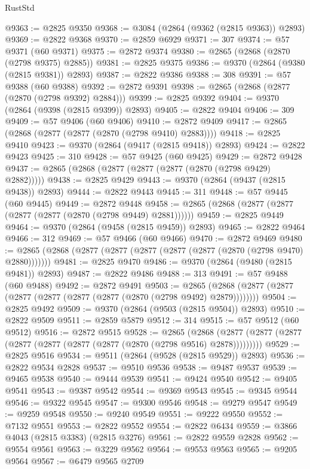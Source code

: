 \begin{lexlean}{RustStd}
\begin{coremodule}
@9363 := @2825 @9350
@9368 := @3084 (@2864 (@9362 (@2815 @9363)) @2893)
@9369 := @2822 @9368
@9370 := @2859 @6929
@9371 := 307
@9374 := @57 @9371 (@60 @9371)
@9375 := @2872 @9374
@9380 := @2865 (@2868 (@2870 (@2798 @9375) @2885))
@9381 := @2825 @9375
@9386 := @9370 (@2864 (@9380 (@2815 @9381)) @2893)
@9387 := @2822 @9386
@9388 := 308
@9391 := @57 @9388 (@60 @9388)
@9392 := @2872 @9391
@9398 := @2865 (@2868 (@2877 (@2870 (@2798 @9392) @2884)))
@9399 := @2825 @9392
@9404 := @9370 (@2864 (@9398 (@2815 @9399)) @2893)
@9405 := @2822 @9404
@9406 := 309
@9409 := @57 @9406 (@60 @9406)
@9410 := @2872 @9409
@9417 := @2865 (@2868 (@2877 (@2877 (@2870 (@2798 @9410) @2883))))
@9418 := @2825 @9410
@9423 := @9370 (@2864 (@9417 (@2815 @9418)) @2893)
@9424 := @2822 @9423
@9425 := 310
@9428 := @57 @9425 (@60 @9425)
@9429 := @2872 @9428
@9437 := @2865 (@2868 (@2877 (@2877 (@2877 (@2870 (@2798 @9429) @2882)))))
@9438 := @2825 @9429
@9443 := @9370 (@2864 (@9437 (@2815 @9438)) @2893)
@9444 := @2822 @9443
@9445 := 311
@9448 := @57 @9445 (@60 @9445)
@9449 := @2872 @9448
@9458 := @2865 (@2868 (@2877 (@2877 (@2877 (@2877 (@2870 (@2798 @9449) @2881))))))
@9459 := @2825 @9449
@9464 := @9370 (@2864 (@9458 (@2815 @9459)) @2893)
@9465 := @2822 @9464
@9466 := 312
@9469 := @57 @9466 (@60 @9466)
@9470 := @2872 @9469
@9480 := @2865 (@2868 (@2877 (@2877 (@2877 (@2877 (@2877 (@2870 (@2798 @9470) @2880)))))))
@9481 := @2825 @9470
@9486 := @9370 (@2864 (@9480 (@2815 @9481)) @2893)
@9487 := @2822 @9486
@9488 := 313
@9491 := @57 @9488 (@60 @9488)
@9492 := @2872 @9491
@9503 := @2865 (@2868 (@2877 (@2877 (@2877 (@2877 (@2877 (@2877 (@2870 (@2798 @9492) @2879))))))))
@9504 := @2825 @9492
@9509 := @9370 (@2864 (@9503 (@2815 @9504)) @2893)
@9510 := @2822 @9509
@9511 := @2859 @5879
@9512 := 314
@9515 := @57 @9512 (@60 @9512)
@9516 := @2872 @9515
@9528 := @2865
    (@2868 (@2877 (@2877 (@2877 (@2877 (@2877 (@2877 (@2877 (@2870 (@2798 @9516) @2878)))))))))
@9529 := @2825 @9516
@9534 := @9511 (@2864 (@9528 (@2815 @9529)) @2893)
@9536 := @2822 @9534 @2828
@9537 := @9510 @9536
@9538 := @9487 @9537
@9539 := @9465 @9538
@9540 := @9444 @9539
@9541 := @9424 @9540
@9542 := @9405 @9541
@9543 := @9387 @9542
@9544 := @9369 @9543
@9545 := @9345 @9544
@9546 := @9322 @9545
@9547 := @9300 @9546
@9548 := @9279 @9547
@9549 := @9259 @9548
@9550 := @9240 @9549
@9551 := @9222 @9550
@9552 := @7132 @9551
@9553 := @2822 @9552
@9554 := @2822 @6434
@9559 := @3866 @4043 (@2815 @3383) (@2815 @3276)
@9561 := @2822 @9559 @2828
@9562 := @9554 @9561
@9563 := @3229 @9562
@9564 := @9553 @9563
@9565 := @9205 @9564
@9567 := @6479 @9565 @2709

\end{coremodule}
\end{lexlean}

